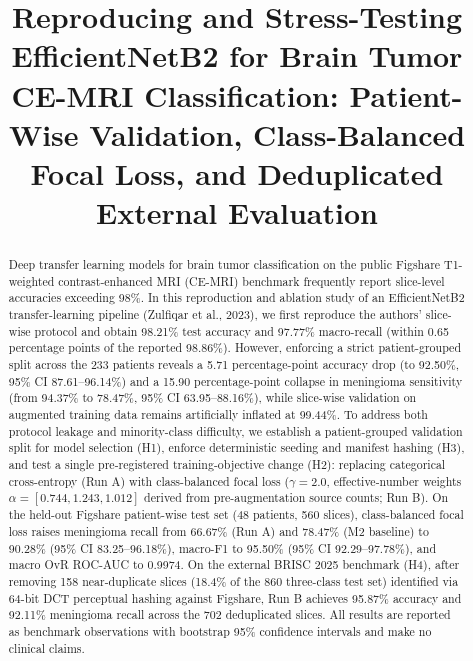 \documentclass[conference]{IEEEtran}
\begin{document}
\title{Reproducing and Stress-Testing EfficientNetB2 for Brain Tumor CE-MRI Classification: Patient-Wise Validation, Class-Balanced Focal Loss, and Deduplicated External Evaluation}

\author{
}

\maketitle

\begin{abstract}
Deep transfer learning models for brain tumor classification on the public Figshare T1-weighted contrast-enhanced MRI (CE-MRI) benchmark frequently report slice-level accuracies exceeding 98\%. In this reproduction and ablation study of an EfficientNetB2 transfer-learning pipeline (Zulfiqar et al., 2023), we first reproduce the authors' slice-wise protocol and obtain 98.21\% test accuracy and 97.77\% macro-recall (within 0.65 percentage points of the reported 98.86\%). However, enforcing a strict patient-grouped split across the 233 patients reveals a 5.71 percentage-point accuracy drop (to 92.50\%, 95\% CI 87.61--96.14\%) and a 15.90 percentage-point collapse in meningioma sensitivity (from 94.37\% to 78.47\%, 95\% CI 63.95--88.16\%), while slice-wise validation on augmented training data remains artificially inflated at 99.44\%. To address both protocol leakage and minority-class difficulty, we establish a patient-grouped validation split for model selection (H1), enforce deterministic seeding and manifest hashing (H3), and test a single pre-registered training-objective change (H2): replacing categorical cross-entropy (Run A) with class-balanced focal loss ($\gamma=2.0$, effective-number weights $\alpha=[0.744, 1.243, 1.012]$ derived from pre-augmentation source counts; Run B). On the held-out Figshare patient-wise test set (48 patients, 560 slices), class-balanced focal loss raises meningioma recall from 66.67\% (Run A) and 78.47\% (M2 baseline) to 90.28\% (95\% CI 83.25--96.18\%), macro-F1 to 95.50\% (95\% CI 92.29--97.78\%), and macro OvR ROC-AUC to 0.9974. On the external BRISC 2025 benchmark (H4), after removing 158 near-duplicate slices (18.4\% of the 860 three-class test set) identified via 64-bit DCT perceptual hashing against Figshare, Run B achieves 95.87\% accuracy and 92.11\% meningioma recall across the 702 deduplicated slices. All results are reported as benchmark observations with bootstrap 95\% confidence intervals and make no clinical claims.
\end{abstract}
\end{document}
